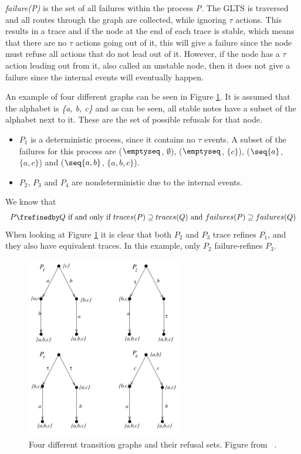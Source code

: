 \textit{failure(P)} is the set of all failures within the process \textit{P}. The GLTS is traversed and all routes through the graph are collected, while ignoring $\tau$ actions. This results in a trace and if the node at the end of each trace is stable, which means that there are no $\tau$ actions going out of it, this will give a failure since the node must refuse all actions that do not lead out of it. However, if the node has a $\tau$ action leading out from it, also called an unstable node, then it does not give a failure since the internal events will eventually happen.

An example of four different graphs can be seen in Figure \ref{fig:failures_graph}. It is assumed that the alphabet is \textit{\{a, b, c\}} and as can be seen, all stable notes have a subset of the alphabet next to it. These are the set of possible refusals for that node.
\begin{itemize}
    \item $P_1$ is a deterministic process, since it contains no $\tau$ events. A subset of the failures for this process are ($\emptyseq$, $\emptyset$), ($\emptyseq$, $\{c\}$), ($\seq{a}$, $\{a,c\}$) and ($\seq{a,b}$, $\{a,b,c\}$).
    \item $P_2$, $P_3$ and $P_4$ are nondeterministic due to the internal events.
\end{itemize}
We know that $$P \frefinedby Q \text{ if and only if } traces(P) \supseteq traces(Q) \text{ and } failures(P) \supseteq failures(Q)$$
When looking at Figure \ref{fig:failures_graph} it is clear that both $P_2$ and $P_3$ trace refines $P_1$, and they also have equivalent traces. In this example, only $P_2$ failure-refines $P_3$.
\begin{figure}[h]
\centering
\includegraphics[width=0.6\textwidth]{figures/failures_graph.jpg}
\caption{Four different transition graphs and their refusal sets. Figure from ~\cite{Roscoe2010}.}
\label{fig:failures_graph}
\end{figure}
